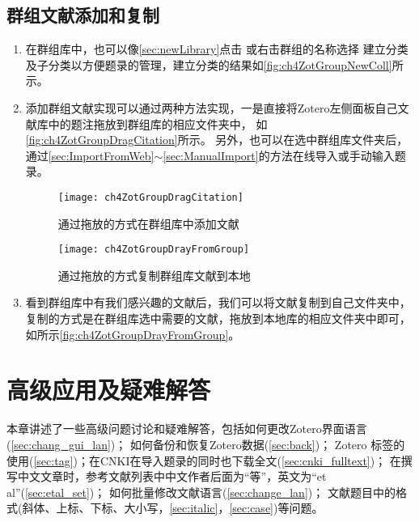 \documentclass[cn,11pt,chinese]{elegantbook}
\begin{document}
\section{群组文献添加和复制}\label{sec:copyGroupLibrary}
\begin{enumerate}
	\item 在群组库中，也可以像\cref{sec:newLibrary}点击
	或右击群组的名称选择
	建立分类及子分类以方便题录的管理，建立分类的结果如\autoref{fig:ch4ZotGroupNewColl}所示。
	\item 添加群组文献实现可以通过两种方法实现，一是直接将Zotero左侧面板自己文献库中的题注拖放到群组库的相应文件夹中，
	如\autoref{fig:ch4ZotGroupDragCitation}所示。
	另外，也可以在选中群组库文件夹后，通过\cref{sec:ImportFromWeb}$\sim$\cref{sec:ManualImport}的方法在线导入或手动输入题录。
		\begin{figure}[htbp]
			\centering
			\texttt{[image: ch4ZotGroupDragCitation]}
			\caption{通过拖放的方式在群组库中添加文献}
			\label{fig:ch4ZotGroupDragCitation}
		\end{figure}

			\begin{figure}[htbp]
			\centering
			\texttt{[image: ch4ZotGroupDrayFromGroup]}
			\caption{通过拖放的方式复制群组库文献到本地}
			\label{fig:ch4ZotGroupDrayFromGroup}
			\end{figure}
		\item 看到群组库中有我们感兴趣的文献后，我们可以将文献复制到自己文件夹中，
		复制的方式是在群组库选中需要的文献，拖放到本地库的相应文件夹中即可，
		如所示\autoref{fig:ch4ZotGroupDrayFromGroup}。
	\end{enumerate}

  \chapter{高级应用及疑难解答}\label{ch:questions}
	本章讲述了一些高级问题讨论和疑难解答，包括如何更改Zotero界面语言(\cref{sec:chang_gui_lan})；
	如何备份和恢复Zotero数据(\cref{sec:back})；
	Zotero 标签的使用(\cref{sec:tag})；在CNKI在导入题录的同时也下载全文(\cref{sec:cnki_fulltext})；
	在撰写中文文章时，参考文献列表中中文作者后面为“等”，英文为“et al”(\cref{sec:etal_set})；
	如何批量修改文献语言(\cref{sec:change_lan})；
	文献题目中的格式(斜体、上标、下标、大小写，\cref{sec:italic}，\cref{sec:case})等问题。
	
\end{document}
